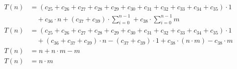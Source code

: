\begin{subequations}
\label{eq:findlinesegments-remove}
\begin{align}
\label{eq:findlinesegments12}
T(n)& = (c_{25} + c_{26} + c_{27} + c_{28} + c_{29} + c_{30} + c_{31} + c_{32} + c_{33} + c_{34} + c_{35}) \cdot 1\\
& \quad + c_{36} \cdot n + (c_{37} + c_{39}) \cdot \sum_{i = 0}^{n - 1} + c_{38} \cdot \sum_{i = 0}^{n-1} m \nonumber \\
\label{eq:findlinesegments13}
T(n)& = (c_{25} + c_{26} + c_{27} + c_{28} + c_{29} + c_{30} + c_{31} + c_{32} + c_{33} + c_{34} + c_{35}) \cdot 1 \\
& \quad + (c_{36} + c_{37} + c_{39}) \cdot n - (c_{37} + c_{39}) \cdot 1 + c_{38} \cdot (n \cdot m) -  c_{38} \cdot m
 \nonumber \\
\label{eq:findlinesegments14}
T(n)& = n + n \cdot m - m\\
\label{eq:findlinesegments15}
T(n)& = n \cdot m
\end{align}
\end{subequations}
